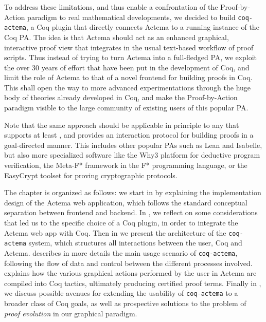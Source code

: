 To address these limitations, and thus enable a confrontation of the
Proof-by-Action paradigm to real mathematical developments, we decided to build
\texttt{coq-actema}, a Coq plugin that directly connects Actema to a running
instance of the Coq PA. The idea is that Actema should act as an enhanced
graphical, interactive proof view that integrates in the usual text-based
workflow of proof scripts. Thus instead of trying to turn Actema into a
full-fledged PA, we exploit the over 30 years of effort that have been put in
the development of Coq, and limit the role of Actema to that of a novel frontend
for building proofs in Coq. This shall open the way to more advanced
experimentations through the huge body of theories already developed in Coq, and
make the Proof-by-Action paradigm visible to the large community of existing
users of this popular PA.

Note that the same approach should be applicable in principle to any  that
supports at least , and provides an interaction protocol for building proofs
in a goal-directed manner. This includes other popular PAs such as Lean and
Isabelle, but also more specialized software like the Why3 platform for
deductive program verification, the Meta-F* framework in the F* programming
language, or the EasyCrypt toolset for proving cryptographic protocols.


The chapter is organized as follows: we start in  by explaining
the implementation design of the Actema web application, which follows the
standard conceptual separation between frontend and backend. In
, we reflect on some considerations that led us to the
specific choice of a Coq plugin, in order to integrate the Actema web app with
Coq. Then in  we present the architecture of the
\texttt{coq-actema} system, which structures all interactions between the user,
Coq and Actema.  describes in more details the main usage
scenario of \texttt{coq-actema}, following the flow of data and control between
the different processes involved.  explains how the various
graphical actions performed by the user in Actema are compiled into Coq tactics,
ultimately producing certified proof terms. Finally in , we
discuss possible avenues for extending the usability of \texttt{coq-actema} to a
broader class of Coq goals, as well as prospective solutions to the problem of
\emph{proof evolution} in our graphical paradigm.

